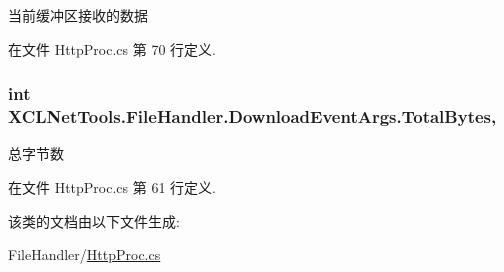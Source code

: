当前缓冲区接收的数据 



在文件 Http\-Proc.\-cs 第 70 行定义.

\hypertarget{class_x_c_l_net_tools_1_1_file_handler_1_1_download_event_args_a344cbcca5a213a50ecd25b90340be816}{
\subsubsection[{Total\-Bytes}]{\setlength{\rightskip}{0pt plus 5cm}int X\-C\-L\-Net\-Tools.\-File\-Handler.\-Download\-Event\-Args.\-Total\-Bytes\hspace{0.3cm}{\ttfamily [get]}, {\ttfamily [set]}}}\label{class_x_c_l_net_tools_1_1_file_handler_1_1_download_event_args_a344cbcca5a213a50ecd25b90340be816}


总字节数 



在文件 Http\-Proc.\-cs 第 61 行定义.



该类的文档由以下文件生成\-:\begin{DoxyCompactItemize}
\item 
File\-Handler/\hyperlink{_http_proc_8cs}{Http\-Proc.\-cs}\end{DoxyCompactItemize}
